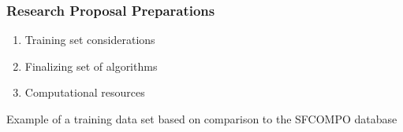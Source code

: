 
\begin{frame}
  \frametitle{Research Proposal Preparations}
  \begin{minipage}[c]{0.38\textwidth}
    \begin{enumerate}
      \item Training set considerations
      \item Finalizing set of algorithms
      \item Computational resources
    \end{enumerate}
  \end{minipage}\hfill
  \begin{minipage}{0.55\textwidth}
    \raggedright
    \begin{table}
      \caption{Example of a training data set based on comparison to the SFCOMPO database \cite{jones_viz_2014, sfcompo}}
    \end{table}
  \end{minipage}
\end{frame}


